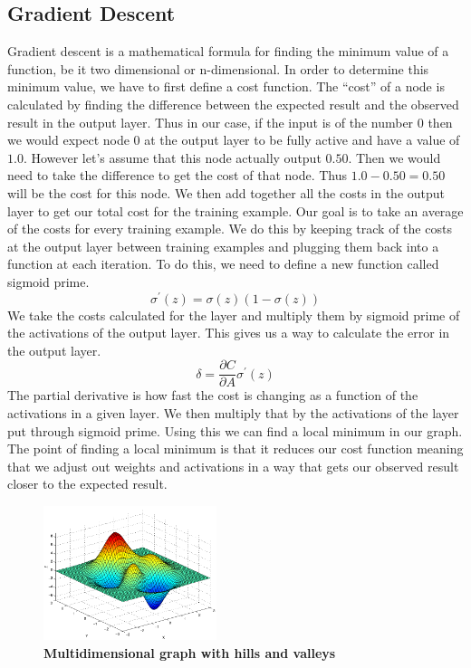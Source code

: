 \documentclass[12pt]{article}
\theoremstyle{definition}
\theoremstyle{plain}
\begin{document}
\subsection{Gradient Descent}
Gradient descent is a mathematical formula for finding the minimum value of a function, be it two dimensional or n-dimensional. In order to determine this minimum value, we have to first define a cost function. The ``cost'' of a node is calculated by finding the difference between the expected result and the observed result in the output layer. Thus in our case, if the input is of the number 0 then we would expect node 0 at the output layer to be fully active and have a value of $1.0$. However let's assume that this node actually output $0.50$. Then we would need to take the difference to get the cost of that node. Thus $1.0-0.50 = 0.50$ will be the cost for this node. We then add together all the costs in the output layer to get our total cost for the training example. Our goal is to take an average of the costs for every training example. We do this by keeping track of the costs at the output layer between training examples and plugging them back into a function at each iteration. To do this, we need to define a new function called sigmoid prime\cite{welch_2015}.
\begin{equation}\label{eqn:SigmoidPrime}
\sigma^\prime(z) = \sigma(z)(1-\sigma(z))
\end{equation}
We take the costs calculated for the layer and multiply them by sigmoid prime of the activations of the output layer. This gives us a way to calculate the error in the output layer\cite{nielsen_2017}.
\begin{equation}\label{eqn:Delta}
\delta = \dfrac{\partial C}{\partial A}\sigma^\prime(z)
\end{equation}
The partial derivative is how fast the cost is changing as a function of the activations in a given layer. We then multiply that by the activations of the layer put through sigmoid prime.  Using this we can find a local minimum in our graph. The point of finding a local minimum is that it reduces our cost function meaning that we adjust out weights and activations in a way that gets our observed result closer to the expected result. 
\begin{figure}
	\centering
	\includegraphics[width=0.45\textwidth]{Images/Gradient.png}
	\caption{\textbf{Multidimensional graph with hills and valleys} \cite{steemit}}
	\label{fig:Gradient}
\end{figure}
\end{document}
